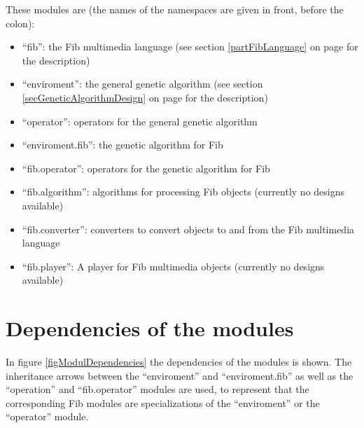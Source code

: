 \noindent
These modules are (the names of the namespaces are given in front, before the colon):
\begin{itemize}
 \item ``fib'': the Fib multimedia language (see section \ref{partFibLanguage} on page \pageref{partFibLanguage} for the description)
 \item ``enviroment'': the general genetic algorithm (see section \ref{secGeneticAlgorithmDesign} on page \pageref{secGeneticAlgorithmDesign} for the description)
 \item ``operator'': operators for the general genetic algorithm    %
 \item ``enviroment.fib'': the genetic algorithm for Fib    %
 \item ``fib.operator'': operators for the genetic algorithm for Fib    %
 \item ``fib.algorithm'': algorithms for processing Fib objects (currently no designs available) %
 \item ``fib.converter'': converters to convert objects to and from the Fib multimedia language    %
 \item ``fib.player'': A player for Fib multimedia objects (currently no designs available) %
\end{itemize}


\section{Dependencies of the modules}

In figure \ref{figModulDependencies} the dependencies of the modules is shown. The inheritance arrows between the ``enviroment'' and ``enviroment.fib'' as well as the ``operation'' and ``fib.operator'' modules are used, to represent that the corresponding Fib modules are specializations of the ``enviroment'' or the ``operator'' module.

